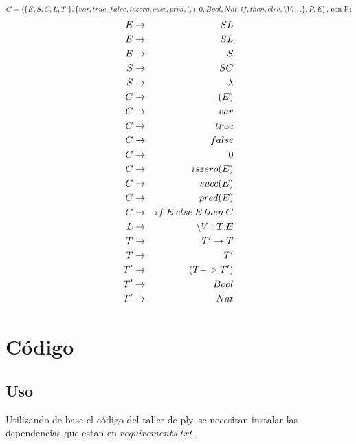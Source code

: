 \documentclass[spanish, a4paper]{article}
\begin{document}
$$G = \left<  \{E,S, C, L, T'\}, \{var, true, false, iszero, succ, pred, (, ), 0, Bool, Nat, if, then, else,  \textnormal{\textbackslash} V, :, . \}, P, E  \right> \textnormal{, con P:} $$
\begin{eqnarray}
 E  & \rightarrow  & S L \nonumber \\
  E  & \rightarrow & S L \nonumber \\
  E  & \rightarrow & S  \nonumber \\
  S  & \rightarrow & S C \nonumber \\
  S  & \rightarrow & \lambda  \nonumber\\
  C  &\rightarrow & (E)  \nonumber\\
  C &  \rightarrow & var  \nonumber\\
  C & \rightarrow & true  \nonumber\\
  C & \rightarrow & false  \nonumber\\
  C & \rightarrow & 0 \nonumber \\
  C & \rightarrow & iszero(E)  \nonumber\\
  C & \rightarrow & succ(E)  \nonumber\\
  C & \rightarrow & pred(E)  \nonumber\\
  C & \rightarrow & if \: E \: else \: E \: then \: C  \nonumber\\
  L & \rightarrow &  \textnormal{\textbackslash} V : T . E  \nonumber\\
  T & \rightarrow & T'  \rightarrow T  \nonumber\\
  T & \rightarrow & T'  \nonumber\\
  T' & \rightarrow & (T -> T')  \nonumber\\
  T' & \rightarrow & Bool  \nonumber\\
  T' &\rightarrow & Nat  \nonumber\\
\end{eqnarray}

\newpage
\section{Código}
\subsection{Uso}
Utilizando de base el código del taller de ply, se necesitan instalar las dependencias que estan en $requirements.txt$.
\end{document}
